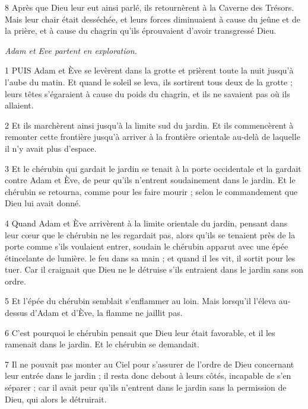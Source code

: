 \par 8 Après que Dieu leur eut ainsi parlé, ils retournèrent à la Caverne des Trésors. Mais leur chair était desséchée, et leurs forces diminuaient à cause du jeûne et de la prière, et à cause du chagrin qu'ils éprouvaient d'avoir transgressé Dieu.


\par \textit{Adam et Eve partent en exploration.}

\par 1 PUIS Adam et Ève se levèrent dans la grotte et prièrent toute la nuit jusqu'à l'aube du matin. Et quand le soleil se leva, ils sortirent tous deux de la grotte ; leurs têtes s'égaraient à cause du poids du chagrin, et ils ne savaient pas où ils allaient.

\par 2 Et ils marchèrent ainsi jusqu'à la limite sud du jardin. Et ils commencèrent à remonter cette frontière jusqu'à arriver à la frontière orientale au-delà de laquelle il n'y avait plus d'espace.

\par 3 Et le chérubin qui gardait le jardin se tenait à la porte occidentale et la gardait contre Adam et Ève, de peur qu'ils n'entrent soudainement dans le jardin. Et le chérubin se retourna, comme pour les faire mourir ; selon le commandement que Dieu lui avait donné.

\par 4 Quand Adam et Ève arrivèrent à la limite orientale du jardin, pensant dans leur cœur que le chérubin ne les regardait pas, alors qu'ils se tenaient près de la porte comme s'ils voulaient entrer, soudain le chérubin apparut avec une épée étincelante de lumière. le feu dans sa main ; et quand il les vit, il sortit pour les tuer. Car il craignait que Dieu ne le détruise s'ils entraient dans le jardin sans son ordre.

\par 5 Et l'épée du chérubin semblait s'enflammer au loin. Mais lorsqu’il l’éleva au-dessus d’Adam et d’Ève, la flamme ne jaillit pas.

\par 6 C'est pourquoi le chérubin pensait que Dieu leur était favorable, et il les ramenait dans le jardin. Et le chérubin se demandait.

\par 7 Il ne pouvait pas monter au Ciel pour s'assurer de l'ordre de Dieu concernant leur entrée dans le jardin ; il resta donc debout à leurs côtés, incapable de s'en séparer ; car il avait peur qu'ils n'entrent dans le jardin sans la permission de Dieu, qui alors le détruirait.

